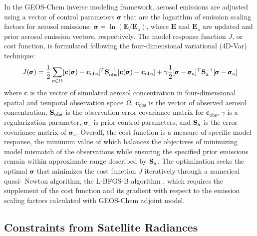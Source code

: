 In the GEOS-Chem inverse modeling framework, aerosol emissions are
adjusted using a vector of control parameters $\pmb{\sigma}$ that are the 
logarithm of emission scaling factors for aerosol emissions: 
$\pmb{\sigma}=\ln(\mathbf{E}/\mathbf{E}_\text{a})$, where
$\mathbf{E}$ and $\mathbf{E}_\text{a}$ are updated and prior aerosol emission
vectors, respectively. The model response function $J$, or cost function, 
is formulated following the four-dimensional variational (4D-Var)
technique:
\begin{equation}
J(\pmb{\sigma})=\frac{1}{2}\sum_{\mathbf{c}\in\Omega}
[\mathbf{c}(\pmb{\sigma})-\mathbf{c}_\text{obs}]^T \mathbf{S}_\text{obs}^{-1}
[\mathbf{c}(\pmb{\sigma})-\mathbf{c}_\text{obs}] +
\gamma\frac{1}{2}[\pmb{\sigma}-\pmb{\sigma}_\text{a}]^T\mathbf{S}_\text{a}^{-1}
[\pmb{\sigma}-\pmb{\sigma}_\text{a}]
\end{equation}
where $\mathbf{c}$ is the vector of simulated aerosol concentration in
four-dimensional spatial and temporal observation space $\Omega$,
$\mathbf{c}_\text{obs}$ is the vector of observed aerosol concentration, 
$\mathbf{S}_\text{obs}$ is the observation error covariance matrix for
$\mathbf{c}_\text{obs}$, $\gamma$ is a regularization parameter,
$\pmb{\sigma}_\text{a}$ is prior control parameters, and $\mathbf{S}_\text{a}$ 
is the error covariance matrix of $\pmb{\sigma}_\text{a}$. Overall, the cost 
function is a measure of specific model response, the minimum value of which 
balances the objectives of minimizing model mismatch of the observations while
ensuring the specified prior emissions remain within approximate range 
described by $\mathbf{S}_\text{a}$. The optimization seeks the optimal
$\pmb{\sigma}$ that minimizes the cost function $J$ iteratively through a 
numerical quasi- Newton algorithm, the L-BFGS-B algorithm \citep{Byrd95}, 
which requires the supplement of the cost function and its gradient with 
respect to the emission scaling factors calculated with GEOS-Chem adjoint 
model.

\subsection{Constraints from Satellite Radiances} \label{subsec:modisobs}

